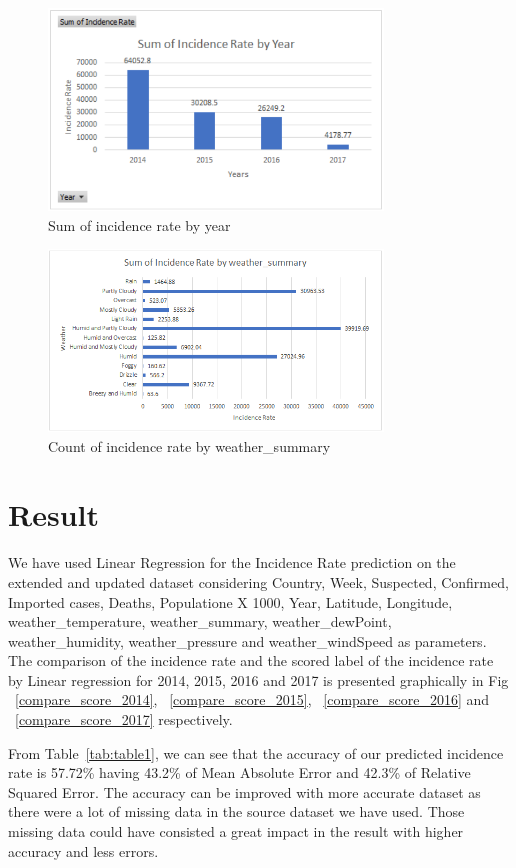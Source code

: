 \documentclass[conference]{IEEEtran}
\begin{document}
\begin{figure}[ht!] %
 \centering
 \includegraphics[width=3.5in]{3.png}
 \caption{Sum of incidence rate by year}
 \label{3}
 \end{figure}


\begin{figure}[ht!] %
 \centering
 \includegraphics[width=3.5in]{4.png}
 \caption{Count of incidence rate by weather\_summary}
 \label{4}
 \end{figure}






\section{Result}
 We have used Linear Regression for the Incidence Rate prediction on the extended and updated dataset considering Country, Week, Suspected, Confirmed, Imported cases, Deaths, Populatione X 1000, Year, Latitude, Longitude, weather\_temperature, weather\_summary, weather\_dewPoint, weather\_humidity, weather\_pressure and weather\_windSpeed as parameters. The comparison of the incidence rate and the scored label of the incidence rate by Linear regression for 2014, 2015, 2016 and 2017 is presented graphically in Fig ~\ref{compare_score_2014}, ~\ref{compare_score_2015}, ~\ref{compare_score_2016} and ~\ref{compare_score_2017} respectively. 

From Table~\ref{tab:table1}, we can see that the accuracy of our predicted incidence rate is 57.72\% having 43.2\% of Mean Absolute Error and 42.3\% of Relative Squared Error. The accuracy can be improved with more accurate dataset as there were a lot of missing data in the source dataset we have used. Those missing data could have consisted a great impact in the result with higher accuracy and less errors.
\end{document}
